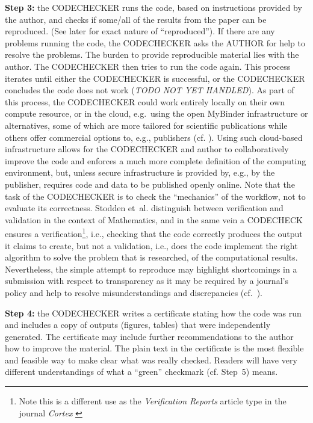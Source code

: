 \documentclass[12pt]{article}
\begin{document}
\textbf{Step 3:} the CODECHECKER runs the code, based on instructions provided by
the author, and checks if some/all of the results from the paper can be
reproduced. (See later for exact nature of ``reproduced''). If there are
any problems running the code, the CODECHECKER asks the AUTHOR for help
to resolve the problems. The burden to provide reproducible material lies with
the author.
The CODECHECKER then tries to run the code again.
This process iterates until either the CODECHECKER is successful,
or the CODECHECKER concludes the code does not work (\emph{TODO NOT
  YET HANDLED}). As part of this process, the CODECHECKER could work entirely
locally on their own compute resource, or in the cloud, e.g.~using the open
MyBinder infrastructure \cite{jupyter_binder_2018} or alternatives, some of which
are more tailored for scientific publications while others offer commercial
options to, e.g., publishers (cf. \cite{konkol_publishing_2020}).
Using such cloud-based 
infrastructure allows for the CODECHECKER and author to collaboratively improve
the code and enforces a much more complete definition of the computing environment,
but, unless secure infrastructure is provided by, e.g., by the publisher, requires code
and data to be published openly online.
Note that the task of the CODECHECKER is to check the ``mechanics'' of the
workflow, not to evaluate its correctness. 
Stodden et~al. \cite{stodden_setting_2013} distinguish between verification and
validation in the context of Mathematics, and in the same vein a CODECHECK
ensures a verification\footnote{Note this is a different use as the \emph{Verification Reports} article type in the journal \emph{Cortex}
\cite{chambers_verification_2020}},
i.e., checking that the code correctly produces the 
output it claims to create, but not a validation, i.e., does the code implement
the right algorithm to solve the problem that is researched, 
of the computational results.
Nevertheless, the simple attempt to reproduce may highlight shortcomings in
a submission with respect to transparency as it may be required by a journal's
policy and help to resolve misunderstandings and discrepancies
(cf.~\cite{christian_journal_2020}).

\textbf{Step 4:} the CODECHECKER writes a certificate stating how the code was
run and includes a copy of outputs (figures, tables) that were
independently generated. The certificate may include further recommendations to
the author how to improve the material.
The plain text in the certificate is the most flexible and feasible way to 
make clear what was really checked. Readers will have very different 
understandings of what a ``green'' checkmark (cf. Step~5) means.
\end{document}
